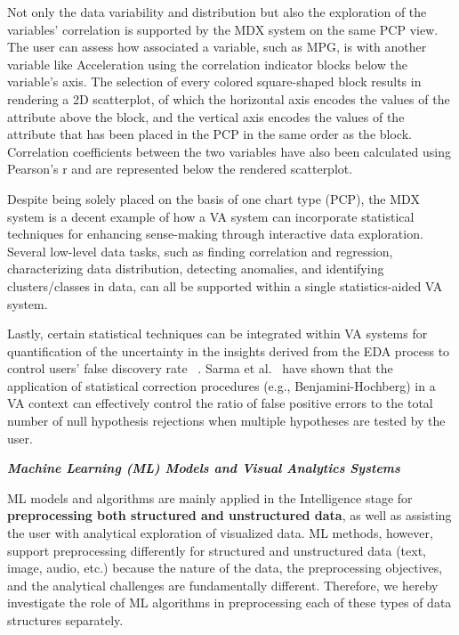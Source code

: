 \documentclass{sfuthesis}
\begin{document}
Not only the data variability and distribution but also the exploration of the variables’ correlation is supported by the MDX system on the same PCP view. The user can assess how associated a variable, such as MPG, is with another variable like Acceleration using the correlation indicator blocks below the variable’s axis. The selection of every colored square-shaped block results in rendering a 2D scatterplot, of which the horizontal axis encodes the values of the attribute above the block, and the vertical axis encodes the values of the attribute that has been placed in the PCP in the same order as the block. Correlation coefficients between the two variables have also been calculated using Pearson’s r and are represented below the rendered scatterplot.\par
Despite being solely placed on the basis of one chart type (PCP), the MDX system is a decent example of how a VA system can incorporate statistical techniques for enhancing sense-making through interactive data exploration. Several low-level data tasks, such as finding correlation and regression, characterizing data distribution, detecting anomalies, and identifying clusters/classes in data, can all be supported within a single statistics-aided VA system.\par
Lastly, certain statistical techniques can be integrated within VA systems for quantification of the uncertainty in the insights derived from the EDA process to control users’ false discovery rate ~\cite{sarma2024odds}. Sarma et al.~\cite{sarma2024odds} have shown that the application of statistical correction procedures (e.g., Benjamini-Hochberg) in a VA context can effectively control the ratio of false positive errors to the total number of null hypothesis rejections when multiple hypotheses are tested by the user.\par
\noindent\textbf{\textit{Machine Learning (ML) Models and Visual Analytics Systems}}\par
ML models and algorithms are mainly applied in the Intelligence stage for \textbf{preprocessing both structured and unstructured data}, as well as assisting the user with analytical exploration of visualized data. ML methods, however, support preprocessing differently for structured and unstructured data (text, image, audio, etc.) because the nature of the data, the preprocessing objectives, and the analytical challenges are fundamentally different. Therefore, we hereby investigate the role of ML algorithms in preprocessing each of these types of data structures separately.\par
\end{document}
